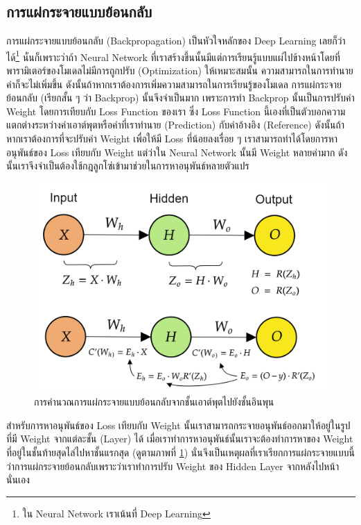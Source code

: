 \subsection{การแผ่กระจายแบบย้อนกลับ}
\label{ssec:backprop}

การแผ่กระจายแบบย้อนกลับ (Backpropagation) เป็นหัวใจหลักของ Deep Learning เลยก็ว่าได้\footnote{ใน Neural Network เราเน้นที่
    Deep Learning} นั่นก็เพราะว่าถ้า Neural Network ที่เราสร้างขึ้นนั้นมีแต่การเรียนรู้แบบแผ่ไปข้างหน้าโดยที่พารามิเตอร์ของโมเดลไม่มีการถูกปรับ
(Optimization) ให้เหมาะสมนั้น ความสามารถในการทำนายค่าก็จะไม่เพิ่มขึ้น ดังนั้นถ้าหากเราต้องการเพิ่มความสามารถในการเรียนรู้ของโมเดล
การแผ่กระจายย้อนกลับ (เรียกสั้น ๆ ว่า Backprop) นั้นจึงจำเป็นมาก เพราะการทำ Backprop นั้นเป็นการปรับค่า Weight โดยการเทียบกับ Loss
Function ของเรา ซึ่ง Loss Function นี้เองที่เป็นตัวบอกความแตกต่างระหว่างค่าเอาต์พุตหรือค่าที่เราทำนาย (Prediction) กับค่าอ้างอิง
(Reference) ดังนั้นถ้าหากเราต้องการที่จะปรับค่า Weight เพื่อให้มี Loss ที่น้อยลงเรื่อย ๆ เราสามารถทำได้โดยการหาอนุพันธ์ของ Loss
เทียบกับ Weight แต่ว่าใน Neural Network นั้นมี Weight หลายค่ามาก ดังนั้นเราจึงจำเป็นต้องใช้กฎลูกโซ่เข้ามาช่วยในการหาอนุพันธ์หลายตัวแปร

\begin{figure}[H]
    \centering
    \includegraphics[width=0.8\linewidth]{fig/nn_backprop.png}
    \caption{การคำนวณการแผ่กระจายแบบย้อนกลับจากชั้นเอาต์พุตไปยังชั้นอินพุน}
    \label{fig:nn_bp}
\end{figure}

สำหรับการหาอนุพันธ์ของ Loss เทียบกับ Weight นั้นเราสามารถกระจายอนุพันธ์ออกมาให้อยู่ในรูปที่มี Weight จากแต่ละชั้น (Layer) ได้
เมื่อเราทำการหาอนุพันธ์นั้นเราจะต้องทำการหาของ Weight ที่อยู่ในชั้นท้ายสุดไล่ไปหาชั้นแรกสุด (ดูตามภาพที่ \ref{fig:nn_bp})
นั่นจึงเป็นเหตุผลที่เราเรียกการแผ่กระจายแบบนี้ว่าการแผ่กระจายย้อนกลับเพราะว่าเราทำการปรับ Weight ของ Hidden Layer จากหลังไปหน้านั่นเอง

